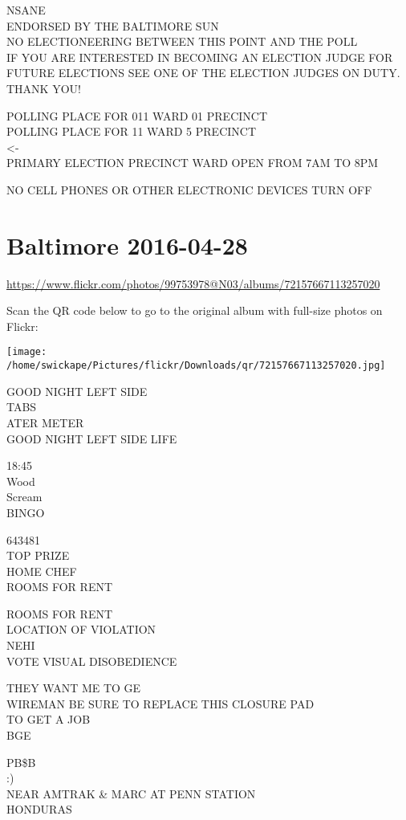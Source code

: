 \documentclass[10pt,letterpaper]{article}
\begin{document}
NSANE\\
ENDORSED BY THE BALTIMORE SUN\\
NO ELECTIONEERING BETWEEN THIS POINT AND THE POLL\\
IF YOU ARE INTERESTED IN BECOMING AN ELECTION JUDGE FOR FUTURE ELECTIONS SEE ONE OF THE ELECTION JUDGES ON DUTY.  THANK YOU!

POLLING PLACE FOR 011 WARD 01 PRECINCT\\
POLLING PLACE FOR 11 WARD 5 PRECINCT\\
<{-}\\
PRIMARY ELECTION PRECINCT WARD OPEN FROM 7AM TO 8PM

NO CELL PHONES OR OTHER ELECTRONIC DEVICES TURN OFF


\section*{Baltimore 2016-04-28}

\url{https://www.flickr.com/photos/99753978@N03/albums/72157667113257020}

Scan the QR code below to go to the original album with full-size photos on Flickr:

\texttt{[image: /home/swickape/Pictures/flickr/Downloads/qr/72157667113257020.jpg]}


GOOD NIGHT LEFT SIDE\\
TABS\\
ATER METER\\
GOOD NIGHT LEFT SIDE LIFE

18:45\\
Wood\\
Scream\\
BINGO

643481\\
TOP PRIZE\\
HOME CHEF\\
ROOMS FOR RENT

ROOMS FOR RENT\\
LOCATION OF VIOLATION\\
NEHI\\
VOTE VISUAL DISOBEDIENCE

THEY WANT ME TO GE\\
WIREMAN BE SURE TO REPLACE THIS CLOSURE PAD\\
TO GET A JOB\\
BGE

PB\$B\\
:)\\
NEAR AMTRAK \& MARC AT PENN STATION\\
HONDURAS
\end{document}
